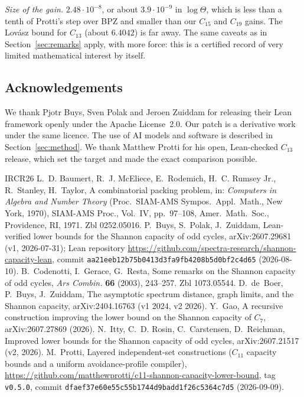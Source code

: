 \documentclass[11pt]{amsart}
\newcommand{\T}{\Theta}
\newcommand{\code}[1]{\texttt{#1}}
\begin{document}
\emph{Size of the gain.} $2.48\cdot10^{-8}$, or about $3.9\cdot10^{-9}$ in $\log\T$, which is
less than a tenth of Protti's step over BPZ and smaller than our $C_{15}$ and $C_{19}$ gains. The
Lovász bound for $C_{13}$ (about $6.4042$) is far away. The same caveats as in
Section~\ref{sec:remarks} apply, with more force: this is a certified record of very limited
mathematical interest by itself.

\subsection*{Acknowledgements} We thank Pjotr Buys, Sven Polak and Jeroen Zuiddam for releasing
their Lean framework openly under the Apache License~2.0. Our patch is a derivative work under
the same licence. The use of AI models and software is described in Section~\ref{sec:method}. We thank
Matthew Protti for his open, Lean-checked $C_{13}$ release, which set the target and made the
exact comparison possible.

\begin{thebibliography}{IRCR26}
 L.~D. Baumert, R.~J. McEliece, E.~Rodemich, H.~C. Rumsey Jr., R.~Stanley, H.~Taylor, A combinatorial packing problem, in: \emph{Computers in Algebra and Number Theory} (Proc.\ SIAM-AMS Sympos.\ Appl.\ Math., New York, 1970), SIAM-AMS Proc., Vol.~IV, pp.~97--108, Amer.\ Math.\ Soc., Providence, RI, 1971. Zbl 0252.05016.
 P.~Buys, S.~Polak, J.~Zuiddam, Lean-verified lower bounds for the Shannon capacity of odd cycles, arXiv:2607.29681 (v1, 2026-07-31); Lean repository \url{https://github.com/spectra-research/shannon-capacity-lean}, commit \code{aa21eeb12b75b0413d3fa9fb4208b5d0bf2c4d65} (2026-08-10).
 B.~Codenotti, I.~Gerace, G.~Resta, Some remarks on the Shannon capacity of odd cycles, \emph{Ars Combin.} \textbf{66} (2003), 243--257. Zbl 1073.05544.
 D.~de~Boer, P.~Buys, J.~Zuiddam, The asymptotic spectrum distance, graph limits, and the Shannon capacity, arXiv:2404.16763 (v1 2024, v2 2026).
 Y.~Gao, A recursive construction improving the lower bound on the Shannon capacity of $C_7$, arXiv:2607.27869 (2026).
 N.~Itty, C.~D. Rosin, C.~Carstensen, D.~Reichman, Improved lower bounds for the Shannon capacity of odd cycles, arXiv:2607.21517 (v2, 2026).
 M.~Protti, Layered independent-set constructions ($C_{11}$ capacity bounds and a uniform avoidance-profile compiler), \url{https://github.com/matthewprotti/c11-shannon-capacity-lower-bound}, tag \code{v0.5.0}, commit \code{dfaef37e60e55c55b1744d9badd1f26c5364c7d5} (2026-09-09).
\end{thebibliography}
\end{document}
